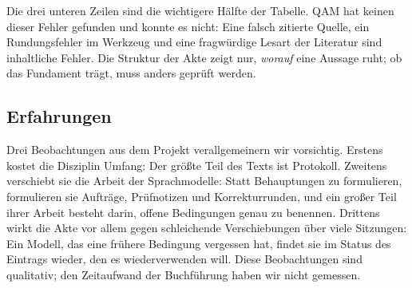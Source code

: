 Die drei unteren Zeilen sind die wichtigere Hälfte der Tabelle. QAM hat keinen dieser Fehler gefunden und konnte es nicht: Eine falsch
zitierte Quelle, ein Rundungsfehler im Werkzeug und eine fragwürdige Lesart der Literatur sind inhaltliche Fehler. Die Struktur der Akte
zeigt nur, \emph{worauf} eine Aussage ruht; ob das Fundament trägt, muss anders geprüft werden.

\subsection{Erfahrungen}

Drei Beobachtungen aus dem Projekt verallgemeinern wir vorsichtig. Erstens kostet die Disziplin Umfang: Der größte Teil des Texts ist
Protokoll. Zweitens verschiebt sie die Arbeit der Sprachmodelle: Statt Behauptungen zu formulieren, formulieren sie Aufträge, Prüfnotizen
und Korrekturrunden, und ein großer Teil ihrer Arbeit besteht darin, offene Bedingungen genau zu benennen. Drittens wirkt die Akte
vor allem gegen schleichende Verschiebungen über viele Sitzungen: Ein Modell, das eine frühere Bedingung vergessen hat, findet sie im
Status des Eintrags wieder, den es wiederverwenden will. Diese Beobachtungen sind qualitativ; den Zeitaufwand der Buchführung haben wir
nicht gemessen.
